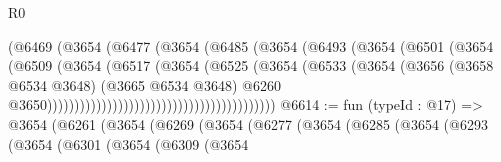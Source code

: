 \begin{lexlean}{R0}
\begin{coremodule}
                                                  (@6469
                                                    (@3654
                                                      (@6477
                                                        (@3654
                                                          (@6485
                                                            (@3654
                                                              (@6493
                                                                (@3654
                                                                  (@6501
                                                                    (@3654
                                                                      (@6509
                                                                        (@3654
                                                                          (@6517
                                                                            (@3654
                                                                              (@6525
                                                                                (@3654
                                                                                  (@6533
                                                                                    (@3654
                                                                                      (@3656
                                                                                        (@3658
                                                                                          @6534
                                                                                          @3648)
                                                                                        (@3665
                                                                                          @6534
                                                                                          @3648)
                                                                                        @6260
                                                                                        @3650))))))))))))))))))))))))))))))))))))))))))
@6614 := fun (typeId : @17) =>
  @3654
    (@6261
      (@3654
        (@6269
          (@3654
            (@6277
              (@3654
                (@6285
                  (@3654
                    (@6293
                      (@3654
                        (@6301
                          (@3654
                            (@6309
                              (@3654

\end{coremodule}
\end{lexlean}
